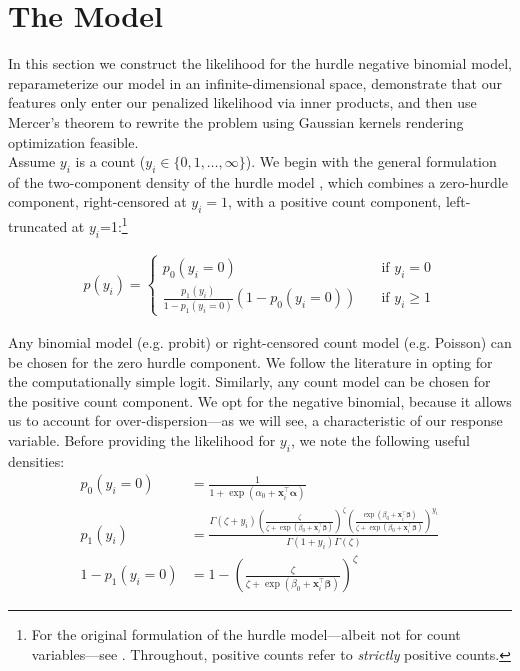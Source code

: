 \documentclass[12pt]{article}
\newcommand{\x}{\mathbf{x}}
\renewcommand{\r}{\right}
\renewcommand{\l}{\left}
\newcommand{\bbeta}{\bm{\beta}}
\newcommand{\balpha}{\bm{\alpha}}
\begin{document}
\section{The Model}		\label{sec:krhnb}

In this section we construct the likelihood for the hurdle negative binomial model, reparameterize our model in an infinite-dimensional space, demonstrate that our features only enter our penalized likelihood via inner products, and then use Mercer's theorem to rewrite the problem using Gaussian kernels rendering optimization feasible.		\\

Assume $y_i$ is a count ($y_i \in \{0,1,\dots,\infty\}$). We begin with the general formulation of the two-component density of the hurdle model \citep{Mullahy1986}, which combines a zero-hurdle component, right-censored at $y_i=1$, with a positive count component, left-truncated at $y_i$=1:\footnote{For the original formulation of the hurdle model---albeit not for count variables---see \cite{Cragg1971}. Throughout, positive counts refer to \textit{strictly} positive counts.}

\begin{align}
  p(y_i) = \begin{cases}
             p_0(y_i = 0) \quad &\text{if } y_i = 0 \\
             \frac{p_1(y_i)}{1 - p_1(y_i = 0)} (1 - p_0(y_i = 0)) \quad &\text{if } y_i \geq 1
           \end{cases}
\end{align} 

Any binomial model (e.g. probit) or right-censored count model (e.g. Poisson) can be chosen for the zero hurdle component. We follow the literature in opting for the computationally simple logit. Similarly, any count model can be chosen for the positive count component. We opt for the negative binomial, because it allows us to account for over-dispersion---as we will see, a characteristic of our response variable. Before providing the likelihood for $y_i$, we note the following useful densities:
%
\begin{align}
  p_0(y_i = 0) &= \frac{1}{1 + \exp(\alpha_0 + \x^\top_i \balpha)} \label{eq:dens0} \\
  p_1(y_i) &= \frac{\Gamma (\zeta + y_i) \l( \frac{\zeta}{\zeta + \exp(\beta_0 + \x^\top_i \bbeta)} \r)^\zeta  \l( \frac{\exp(\beta_0 + \x^\top_i \bbeta)}{\zeta + \exp(\beta_0 + \x^\top_i \bbeta)} \r)^{y_i}}{\Gamma(1 + y_i) \Gamma(\zeta)} \label{eq:densmu} \\
  1 - p_1(y_i = 0) &= 1 -  \l( \frac{\zeta}{\zeta + \exp(\beta_0 + \x^\top_i \bbeta)} \r)^\zeta \label{eq:denstrunc} 
\end{align} 
\end{document}
